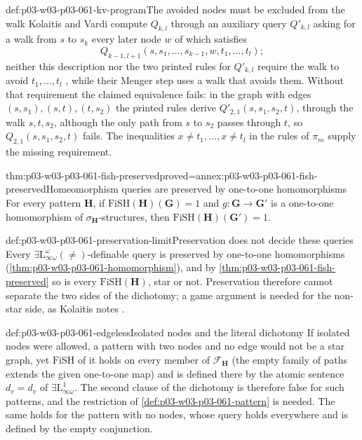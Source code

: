\begin{hbwarning}{def:p03-w03-p03-061-kv-program}{The avoided nodes must be excluded from the walk}
Kolaitis and Vardi compute \(Q_{k,l}\) through an auxiliary query
\(Q'_{k,l}\) asking for a walk from \(s\) to \(s_k\) every later node \(w\)
of which satisfies
\[
 Q_{k-1,l+1}(s,s_1,\ldots,s_{k-1},w,t_1,\ldots,t_l);
\]
neither this description nor the two printed rules for \(Q'_{k,l}\) require
the walk to avoid \(t_1,\ldots,t_l\)
\cite[p.~25]{KolaitisVardi1995DatalogManuscript}, while their Menger step
uses a walk that avoids them. Without that requirement the claimed
equivalence fails: in the graph with edges \((s,s_1),(s,t),(t,s_2)\) the
printed rules derive \(Q'_{2,1}(s,s_1,s_2,t)\), through the walk
\(s,t,s_2\), although the only path from \(s\) to \(s_2\) passes through
\(t\), so \(Q_{2,1}(s,s_1,s_2,t)\) fails. The inequalities
\(x\neq t_1,\ldots,x\neq t_l\) in the rules of \(\pi_m\) supply the missing
requirement.
\end{hbwarning}

\begin{hbtheorem}{thm:p03-w03-p03-061-fish-preserved}{proved=annex:p03-w03-p03-061-fish-preserved}{Homeomorphism queries are preserved by one-to-one homomorphisms}
For every pattern \(\mathbf H\), if \(\mathrm{FiSH}(\mathbf H)(\mathbf G)=1\)
and \(g\colon\mathbf G\to\mathbf G'\) is a one-to-one homomorphism of
\(\sigma_{\mathbf H}\)-structures, then
\(\mathrm{FiSH}(\mathbf H)(\mathbf G')=1\).
\end{hbtheorem}

\begin{hbwarning}{def:p03-w03-p03-061-preservation-limit}{Preservation does not decide these queries}
Every \(\exists\mathrm L^\omega_{\infty\omega}(\neq)\)-definable query is
preserved by one-to-one homomorphisms
(\cref{thm:p03-w03-p03-061-homomorphism}), and by
\cref{thm:p03-w03-p03-061-fish-preserved} so is every
\(\mathrm{FiSH}(\mathbf H)\), star or not. Preservation therefore cannot
separate the two sides of the dichotomy; a game argument is needed for the
non-star side, as Kolaitis notes \cite[p.~79]{Kolaitis2003ExpressivePowerNotes}.
\end{hbwarning}

\begin{hbwarning}{def:p03-w03-p03-061-edgeless}{Isolated nodes and the literal dichotomy}
If isolated nodes were allowed, a pattern with two nodes and no edge would
not be a star graph, yet \(\mathrm{FiSH}\) of it holds on every member of
\(\mathcal F_{\mathbf H}\) (the empty family of paths extends the given
one-to-one map) and is defined there by the atomic sentence \(d_v=d_v\) of
\(\exists\mathrm L^1_{\infty\omega}\). The second clause of the dichotomy is
therefore false for such patterns, and the restriction of
\cref{def:p03-w03-p03-061-pattern} is needed. The same holds for the pattern with
no nodes, whose query holds everywhere and is defined by the empty
conjunction.
\end{hbwarning}

